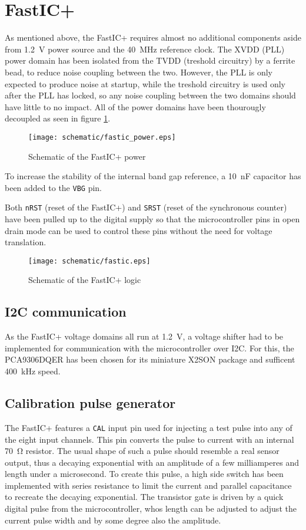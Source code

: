 \section{FastIC+}
As mentioned above, the FastIC+ requires almost no additional components aside from \SI{1.2}{\volt} power source and the \SI{40}{\mega\hertz} reference clock. The XVDD (PLL) power domain has been isolated from the TVDD (treshold circuitry) by a ferrite bead, to reduce noise coupling between the two. However, the PLL is only expected to produce noise at startup, while the treshold circuitry is used only after the PLL has locked, so any noise coupling between the two domains should have little to no impact. All of the power domains have been thourougly decoupled as seen in figure \ref{fig:fastic_power}.
%
\FloatBarrier
\begin{figure}[htp!]
    \centering
    \texttt{[image: schematic/fastic\_power.eps]}
    \caption{Schematic of the FastIC+ power}
    \label{fig:fastic_power}
\end{figure}
\FloatBarrier
%
To increase the stability of the internal band gap reference, a \SI{10}{\nano\farad} capacitor has been added to the \verb|VBG| pin.

Both \verb|nRST| (reset of the FastIC+) and \verb|SRST| (reset of the synchronous counter) have been pulled up to the digital supply so that the microcontroller pins in open drain mode can be used to control these pins without the need for voltage translation. 

\FloatBarrier
\begin{figure}[htp!]
    \centering
    \texttt{[image: schematic/fastic.eps]}
    \caption{Schematic of the FastIC+ logic}
    \label{fig:fastic}
\end{figure}
\FloatBarrier


%
\subsection{I2C communication}
As the FastIC+ voltage domains all run at \SI{1.2}{\volt}, a voltage shifter had to be implemented for communication with the microcontroller over I2C. For this, the PCA9306DQER has been chosen for its miniature X2SON package and sufficent \SI{400}{\kilo\hertz} speed. 
%
\subsection{Calibration pulse generator}
The FastIC+ features a \verb|CAL| input pin used for injecting a test pulse into any of the eight input channels. This pin converts the pulse to current with an internal \SI{70}{\ohm} resistor. The usual shape of such a pulse should resemble a real sensor output, thus a decaying exponential with an amplitude of a few milliamperes and length under a microsecond. To create this pulse, a high side switch has been implemented with series resistance to limit the current and parallel capacitance to recreate the decaying exponential. The transistor gate is driven by a quick digital pulse from the microcontroller, whos length can be adjusted to adjust the current pulse width and by some degree also the amplitude. 
%
